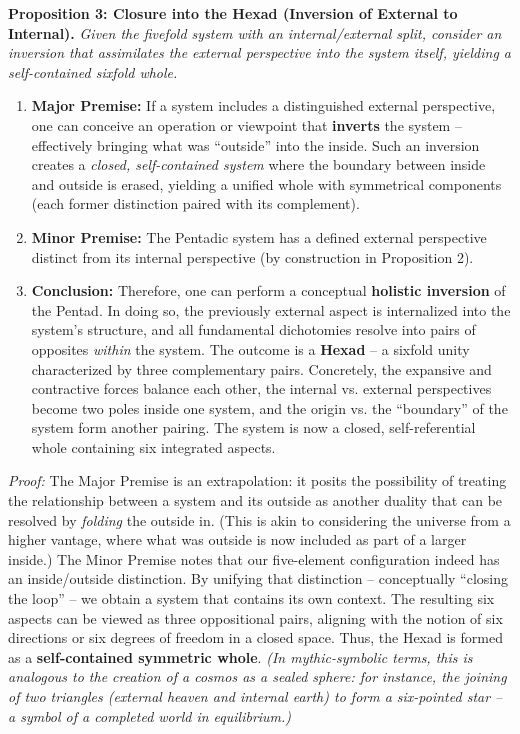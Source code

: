 \documentclass[11pt]{article}
\theoremstyle{plain}
\begin{document}
\textbf{Proposition 3: Closure into the Hexad (Inversion of External to Internal).} \textit{Given the fivefold system with an internal/external split, consider an inversion that assimilates the external perspective into the system itself, yielding a self-contained sixfold whole.}

\begin{enumerate}
    \item \textbf{Major Premise:} If a system includes a distinguished external perspective, one can conceive an operation or viewpoint that \textbf{inverts} the system – effectively bringing what was “outside” into the inside. Such an inversion creates a \textit{closed, self-contained system} where the boundary between inside and outside is erased, yielding a unified whole with symmetrical components (each former distinction paired with its complement).
    \item \textbf{Minor Premise:} The Pentadic system has a defined external perspective distinct from its internal perspective (by construction in Proposition 2).
    \item \textbf{Conclusion:} Therefore, one can perform a conceptual \textbf{holistic inversion} of the Pentad. In doing so, the previously external aspect is internalized into the system’s structure, and all fundamental dichotomies resolve into pairs of opposites \textit{within} the system. The outcome is a \textbf{Hexad} – a sixfold unity characterized by three complementary pairs. Concretely, the expansive and contractive forces balance each other, the internal vs. external perspectives become two poles inside one system, and the origin vs. the “boundary” of the system form another pairing. The system is now a closed, self-referential whole containing six integrated aspects.
\end{enumerate}
\textit{Proof:} The Major Premise is an extrapolation: it posits the possibility of treating the relationship between a system and its outside as another duality that can be resolved by \textit{folding} the outside in. (This is akin to considering the universe from a higher vantage, where what was outside is now included as part of a larger inside.) The Minor Premise notes that our five-element configuration indeed has an inside/outside distinction. By unifying that distinction – conceptually “closing the loop” – we obtain a system that contains its own context. The resulting six aspects can be viewed as three oppositional pairs, aligning with the notion of six directions or six degrees of freedom in a closed space. Thus, the Hexad is formed as a \textbf{self-contained symmetric whole}. \textit{(In mythic-symbolic terms, this is analogous to the creation of a cosmos as a sealed sphere: for instance, the joining of two triangles (external heaven and internal earth) to form a six-pointed star – a symbol of a completed world in equilibrium.)}
\end{document}
